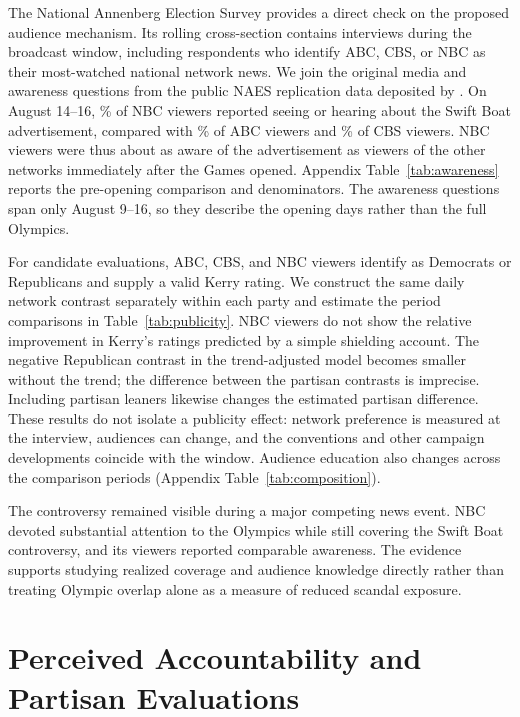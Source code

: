 \documentclass[11pt]{article}
\begin{document}
The National Annenberg Election Survey provides a direct check on the proposed audience mechanism. Its rolling cross-section contains \PublicityInterviews{} interviews during the broadcast window, including \PublicityNetworkViewers{} respondents who identify ABC, CBS, or NBC as their most-watched national network news. We join the original media and awareness questions from the public NAES replication data deposited by \citet{macdonald2025data}. On August 14--16, \AwareNBC\% of NBC viewers reported seeing or hearing about the Swift Boat advertisement, compared with \AwareABC\% of ABC viewers and \AwareCBS\% of CBS viewers. NBC viewers were thus about as aware of the advertisement as viewers of the other networks immediately after the Games opened. Appendix Table~\ref{tab:awareness} reports the pre-opening comparison and denominators. The awareness questions span only August 9--16, so they describe the opening days rather than the full Olympics.

For candidate evaluations, \PublicityPartisanRatings{} ABC, CBS, and NBC viewers identify as Democrats or Republicans and supply a valid Kerry rating. We construct the same daily network contrast separately within each party and estimate the period comparisons in Table~\ref{tab:publicity}. NBC viewers do not show the relative improvement in Kerry's ratings predicted by a simple shielding account. The negative Republican contrast in the trend-adjusted model becomes smaller without the trend; the difference between the partisan contrasts is imprecise. Including partisan leaners likewise changes the estimated partisan difference. These results do not isolate a publicity effect: network preference is measured at the interview, audiences can change, and the conventions and other campaign developments coincide with the window. Audience education also changes across the comparison periods (Appendix Table~\ref{tab:composition}).

The controversy remained visible during a major competing news event. NBC devoted substantial attention to the Olympics while still covering the Swift Boat controversy, and its viewers reported comparable awareness. The evidence supports studying realized coverage and audience knowledge directly rather than treating Olympic overlap alone as a measure of reduced scandal exposure.

\section{Perceived Accountability and Partisan Evaluations}
\end{document}
